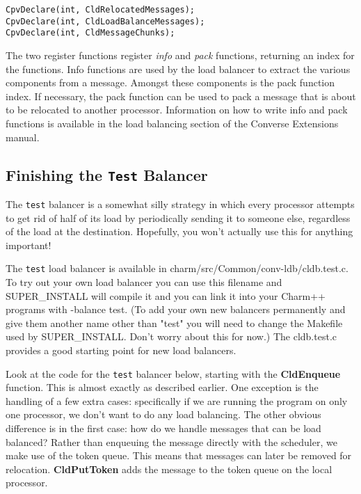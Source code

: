 \begin{verbatim}
CpvDeclare(int, CldRelocatedMessages);
CpvDeclare(int, CldLoadBalanceMessages);
CpvDeclare(int, CldMessageChunks);
\end{verbatim}

The two register functions register {\sl info} and {\sl pack}
functions, returning an index for the functions.  Info functions are
used by the load balancer to extract the various components from a
message.  Amongst these components is the pack function index.  If
necessary, the pack function can be used to pack a message that is
about to be relocated to another processor.  Information on how
to write info and pack functions is available in the load balancing
section of the Converse Extensions manual. 

\subsection{Finishing the {\tt Test} Balancer}

The {\tt test} balancer is a somewhat silly strategy in which every
processor attempts to get rid of half of its load by periodically
sending it to someone else, regardless of the load at the
destination.  Hopefully, you won't actually use this for anything
important!

The {\tt test} load balancer is available in
charm/src/Common/conv-ldb/cldb.test.c.  To try out your own load
balancer you can use this filename and SUPER\_INSTALL will compile it
and you can link it into your Charm++ programs with -balance test.
(To add your own new balancers permanently and give them another name
other than "test" you will need to change the Makefile used by
SUPER\_INSTALL. Don't worry about this for now.)  The cldb.test.c
provides a good starting point for new load balancers.

Look at the code for the {\tt test} balancer below, starting with the
{\bf CldEnqueue} function.  This is almost exactly as described
earlier.  One exception is the handling of a few extra cases:
specifically if we are running the program on only one processor, we
don't want to do any load balancing.  The other obvious difference is
in the first case: how do we handle messages that can be load
balanced?  Rather than enqueuing the message directly with the
scheduler, we make use of the token queue.  This means that messages
can later be removed for relocation.  {\bf CldPutToken} adds the
message to the token queue on the local processor.

